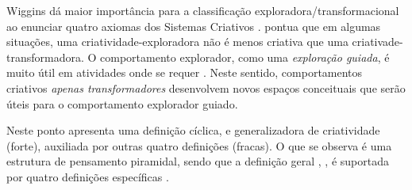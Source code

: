  Wiggins dá maior importância para a classificação exploradora/transformacional ao enunciar quatro axiomas dos Sistemas Criativos .  pontua que em algumas situações, uma criatividade-exploradora não é menos criativa que uma criativade-transformadora. O comportamento explorador, como uma \emph{exploração guiada}, é muito útil em atividades onde se requer  . Neste sentido, comportamentos criativos \emph{apenas transformadores} desenvolvem novos espaços conceituais que serão úteis para o comportamento explorador guiado. 


Neste ponto  apresenta uma definição cíclica, e generalizadora de criatividade (forte), auxiliada por outras quatro definições (fracas). O que se observa é uma estrutura de pensamento piramidal, sendo que a definição geral , , é suportada por quatro definições específicas .

